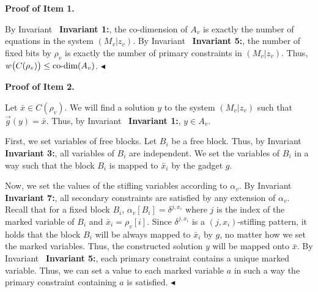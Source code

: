\documentclass[10pt,a4paper]{article}
\begin{document}



\par\medskip\noindent\textbf{Proof of Item 1.}\par




By Invariant \textbf{ Invariant 1:}, the co-dimension of $A_{v}$ is exactly the number of equations in the system $(M_{v}|z_{v})$.
By Invariant \textbf{ Invariant 5:}, the number of fixed bits by $\rho_{v}$ is exactly the number of primary constraints in $(M_{v}|z_{v})$.
Thus, $w\bigl{(}C(\rho_{v})\bigr{)}\leq\text{co-dim}(A_{v})$.
$\blacktriangleleft$\par





\par\medskip\noindent\textbf{Proof of Item 2.}\par




Let $\bar{x}\in C(\rho_{v})$.
We will find a solution $y$ to the system $(M_{v}|z_{v})$ such that $\overrightarrow{g}(y)=\bar{x}$.
Thus, by Invariant \textbf{ Invariant 1:}, $y\in A_{v}$.\par




First, we set variables of free blocks.
Let $B_{i}$ be a free block.
Thus, by Invariant \textbf{ Invariant 3:}, all variables of $B_{i}$ are independent.
We set the variables of $B_{i}$ in a way such that the block $B_{i}$ is mapped to $\bar{x}_{i}$ by the gadget $g$.\par




Now, we set the values of the stifling variables according to $\alpha_{v}$.
By Invariant \textbf{ Invariant 7:}, all secondary constraints are satisfied by any extension of $\alpha_{v}$.
Recall that for a fixed block $B_{i}$, $\alpha_{v}[B_{i}]=\delta^{j,x_{i}}$ where $j$ is the index of the marked variable of $B_{i}$ and $\bar{x}_{i}=\rho_{v}[i]$.
Since $\delta^{j,x_{i}}$ is a $(j,x_{i})$-stifling pattern, it holds that the block $B_{i}$ will be always mapped to $\bar{x}_{i}$ by $g$, no matter how we set the marked variables.
Thus, the constructed solution $y$ will be mapped onto $\bar{x}$.
By Invariant \textbf{ Invariant 5:}, each primary constraint contains a unique marked variable.
Thus, we can set a value to each marked variable $a$ in such a way the primary constraint containing $a$ is satisfied.
$\blacktriangleleft$\par
\end{document}
